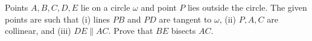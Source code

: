 Points $A,B,C,D,E$ lie on a circle $\omega$ and point $P$ lies outside the circle. The given points are such that (i) lines $PB$ and $PD$ are tangent to $\omega$, (ii) $P, A,C$ are collinear, and (iii) $DE\parallel AC$. Prove that $BE$ bisects $AC$.